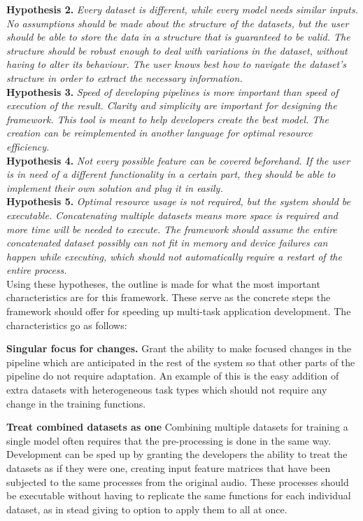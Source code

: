 \textbf{Hypothesis 2.} \textit{Every dataset is different, while every model needs similar inputs. No assumptions should be made about the structure of the datasets, but the user should be able to store the data in a structure that is guaranteed to be valid. The structure should be robust enough to deal with variations in the dataset, without having to alter its behaviour. The user knows best how to navigate the dataset's structure in order to extract the necessary information.}\\

\textbf{Hypothesis 3.} \textit{Speed of developing pipelines is more important than speed of execution of the result. Clarity and simplicity are important for designing the framework. This tool is meant to help developers create the best model. The creation can be reimplemented in another language for optimal resource efficiency.}\\

\textbf{Hypothesis 4.} \textit{Not every possible feature can be covered beforehand. If the user is in need of a different functionality in a certain part, they should be able to implement their own solution and plug it in easily.}\\

\textbf{Hypothesis 5.} \textit{Optimal resource usage is not required, but the system should be executable. Concatenating multiple datasets means more space is required and more time will be needed to execute. The framework should assume the entire concatenated dataset possibly can not fit in memory and device failures can happen while executing, which should not automatically require a restart of the entire process.}\\

Using these hypotheses, the outline is made for what the most important characteristics are for this framework. These serve as the concrete steps the framework should offer for speeding up multi-task application development. The characteristics go as follows:

\textbf{Singular focus for changes.}  Grant the ability to make focused changes in the pipeline which are anticipated in the rest of the system so that other parts of the pipeline do not require adaptation. An example of this is the easy addition of extra datasets with heterogeneous task types which should not require any change in the training functions.

\textbf{Treat combined datasets as one} Combining multiple datasets for training a single model often requires that the pre-processing is done in the same way. Development can be sped up by granting the developers the ability to treat the datasets as if they were one, creating input feature matrices that have been subjected to the same processes from the original audio. These processes should be executable without having to replicate the same functions for each individual dataset, as in stead giving to option to apply them to all at once.

